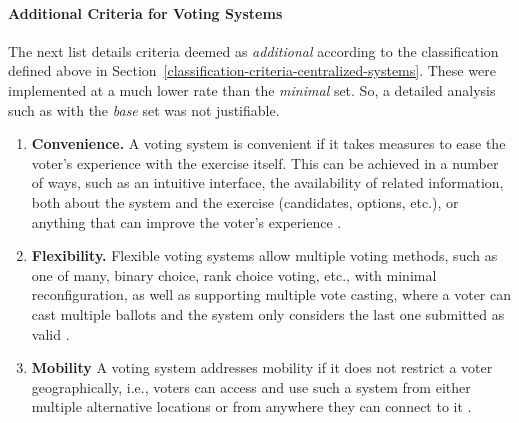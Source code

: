 \documentclass[../access.tex]{subfiles}
\begin{document}
    \paragraph{Additional Criteria for Voting Systems}
    \label{additional-classification-criteria}
    The next list details criteria deemed as \textit{additional} according to the classification defined above in Section~\ref{classification-criteria-centralized-systems}. These were implemented at a much lower rate than the \textit{minimal} set. So, a detailed analysis such as with the \textit{base} set was not justifiable.
    \begin{enumerate}
        \item \textbf{Convenience.} A voting system is convenient if it takes measures to ease the voter's experience with the exercise itself. This can be achieved in a number of ways, such as an intuitive interface, the availability of related information, both about the system and the exercise (candidates, options, etc.), or anything that can improve the voter's experience \cite{Radwin1995}.
        
        \item \textbf{Flexibility.} Flexible voting systems allow multiple voting methods, such as one of many, binary choice, rank choice voting, etc., with minimal reconfiguration, as well as supporting multiple vote casting, where a voter can cast multiple ballots and the system only considers the last one submitted as valid \cite{Sako1994}.
        
        \item \textbf{Mobility} A voting system addresses mobility if it does not restrict a voter geographically, i.e., voters can access and use such a system from either multiple alternative locations or from anywhere they can connect to it \cite{Faria2012}.
    \end{enumerate}
\end{document}
